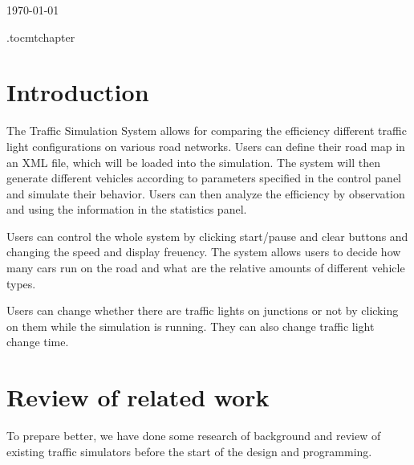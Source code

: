 \documentclass[a4paper,12pt]{article}
\begin{document}
\begin{titlepage}
{\large \today}\\[3cm] %




\vfill %

\end{titlepage}

\etocdepthtag.toc{mtchapter}
\tableofcontents

\newpage

\section{Introduction}
The Traffic Simulation System allows for comparing the efficiency different traffic light configurations on various road networks. Users can define their road map in an XML file, which will be loaded into the simulation. The system will then generate different vehicles according to parameters specified in the control panel and simulate their behavior. Users can then analyze the efficiency by observation and using the information in the statistics panel.

Users can control the whole system by clicking start/pause and clear buttons and changing the speed and display freuency. The system allows users to decide how many cars run on the road and what are the relative amounts of different vehicle types.

Users can change whether there are traffic lights on junctions or not by clicking on them while the simulation is running. They can also change traffic light change time.

\section{Review of related work}
To prepare better, we have done some research of background and review of existing traffic simulators before the start of the design and programming.\\
\end{document}
